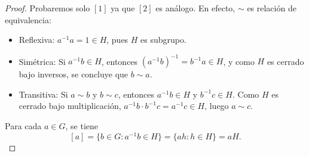 \begin{proof}
	Probaremos solo $[1]$ ya que $[2]$ es análogo. En efecto, \( \sim \) es relación de equivalencia:
	\begin{itemize}
		\item Reflexiva: \( a^{-1}a = 1 \in H \), pues \( H \) es subgrupo.
		\item Simétrica: Si \( a^{-1}b \in H \), entonces \( (a^{-1}b)^{-1} = b^{-1}a \in H \), y como \( H \) es cerrado bajo inversos, se concluye que \( b \sim a \).
		\item Transitiva: Si \( a \sim b \) y \( b \sim c \), entonces \( a^{-1}b \in H \) y \( b^{-1}c \in H \). Como \( H \) es cerrado bajo multiplicación, \( a^{-1}b \cdot b^{-1}c = a^{-1}c \in H \), luego \( a \sim c \).
	\end{itemize}
	Para cada \( a \in G \), se tiene
	\[
	[a] = \{ b \in G : a^{-1}b \in H \} = \{ ah : h \in H \} = aH.
	\]
\end{proof}


\begin{definicion}
\end{definicion}


\begin{proposicion}\label{lkjhg}
\end{proposicion}

